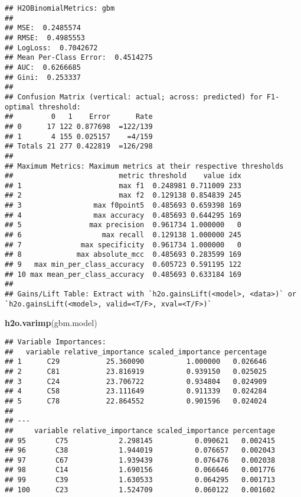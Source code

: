 \documentclass[]{article}
\newenvironment{Shaded}{\begin{snugshade}}{\end{snugshade}}
\newcommand{\KeywordTok}[1]{\textcolor[rgb]{0.13,0.29,0.53}{\textbf{{#1}}}}
\newcommand{\NormalTok}[1]{{#1}}
\begin{document}
\begin{verbatim}
## H2OBinomialMetrics: gbm
## 
## MSE:  0.2485574
## RMSE:  0.4985553
## LogLoss:  0.7042672
## Mean Per-Class Error:  0.4514275
## AUC:  0.6266685
## Gini:  0.253337
## 
## Confusion Matrix (vertical: actual; across: predicted) for F1-optimal threshold:
##         0   1    Error      Rate
## 0      17 122 0.877698  =122/139
## 1       4 155 0.025157    =4/159
## Totals 21 277 0.422819  =126/298
## 
## Maximum Metrics: Maximum metrics at their respective thresholds
##                         metric threshold    value idx
## 1                       max f1  0.248981 0.711009 233
## 2                       max f2  0.129138 0.854839 245
## 3                 max f0point5  0.485693 0.659398 169
## 4                 max accuracy  0.485693 0.644295 169
## 5                max precision  0.961734 1.000000   0
## 6                   max recall  0.129138 1.000000 245
## 7              max specificity  0.961734 1.000000   0
## 8             max absolute_mcc  0.485693 0.283599 169
## 9   max min_per_class_accuracy  0.605723 0.591195 122
## 10 max mean_per_class_accuracy  0.485693 0.633184 169
## 
## Gains/Lift Table: Extract with `h2o.gainsLift(<model>, <data>)` or `h2o.gainsLift(<model>, valid=<T/F>, xval=<T/F>)`
\end{verbatim}

\begin{Shaded}
\begin{Highlighting}[]
\KeywordTok{h2o.varimp}\NormalTok{(gbm.model)}
\end{Highlighting}
\end{Shaded}

\begin{verbatim}
## Variable Importances: 
##   variable relative_importance scaled_importance percentage
## 1      C29           25.360090          1.000000   0.026646
## 2      C81           23.816919          0.939150   0.025025
## 3      C24           23.706722          0.934804   0.024909
## 4      C58           23.111649          0.911339   0.024284
## 5      C78           22.864552          0.901596   0.024024
## 
## ---
##     variable relative_importance scaled_importance percentage
## 95       C75            2.298145          0.090621   0.002415
## 96       C38            1.944019          0.076657   0.002043
## 97       C67            1.939439          0.076476   0.002038
## 98       C14            1.690156          0.066646   0.001776
## 99       C39            1.630533          0.064295   0.001713
## 100      C23            1.524709          0.060122   0.001602
\end{verbatim}
\end{document}
